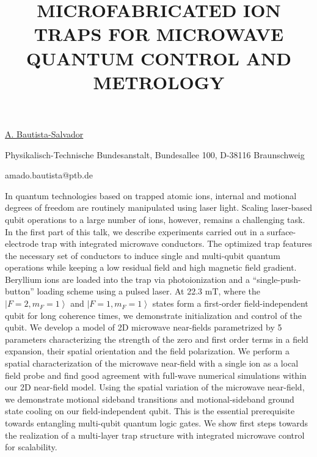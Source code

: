 \title{MICROFABRICATED ION TRAPS FOR MICROWAVE QUANTUM CONTROL AND METROLOGY}

\underline{A. Bautista-Salvador} 

{\normalsize{\vspace{-4mm}
Physikalisch-Technische Bundesanstalt,
Bundesallee 100,
D-38116 Braunschweig

\email amado.bautista@ptb.de}}

In quantum technologies based on trapped atomic ions, internal and motional degrees of freedom are routinely manipulated using laser light. Scaling laser-based qubit operations to a large number of ions, however, remains a challenging task. In the first part of this talk, we describe experiments carried out in a surface-electrode trap with integrated microwave conductors. The optimized trap features the necessary set of conductors to induce single and multi-qubit quantum operations while keeping a low residual field and high magnetic field gradient. Beryllium ions are loaded into the trap via photoionization and a ``single-push-button'' loading scheme using a pulsed laser. At 22.3 $\mathrm{mT}$, where the $\left|F=2,m_F=1\right>$ and $\left|F=1,m_F=1\right>$ states form a first-order field-independent qubit for long coherence times, we demonstrate initialization and control of the qubit. We develop a model of 2D microwave near-fields parametrized by 5 parameters characterizing the strength of the zero and first order terms in a field expansion, their spatial orientation and the field polarization. We perform a spatial characterization of the microwave near-field with a single ion as a local field probe and find good agreement with full-wave numerical simulations within our 2D near-field model. Using the spatial variation of the microwave near-field, we demonstrate motional sideband transitions and motional-sideband ground state cooling on our field-independent qubit. This is the essential prerequisite towards entangling multi-qubit quantum logic gates. We show first steps towards the realization of a multi-layer trap structure with integrated microwave control for scalability.

